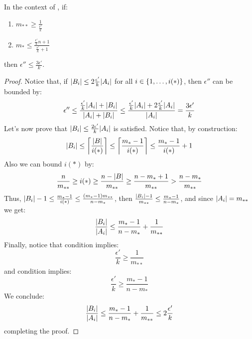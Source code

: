     \begin{remark}[Remark 5.14.3] \label{rmk:epsilons_proportion_can_be_k}
        In the context of , if:
        \begin{enumerate}[label=(\alph*), ref=\alph*]
            \item \label{itm:epsilons_proportion_can_be_k.a} $m_{**} \geq \frac{1}{\frac{\epsilon'}{k}}$
            \item \label{itm:epsilons_proportion_can_be_k.b} $m_* \leq \frac{\frac{\epsilon'}{k} n + 1}{\frac{\epsilon'}{k} + 1}$
        \end{enumerate}
        then $\epsilon'' \leq \frac{3 \epsilon'}{k}$.
        \begin{proof}
            Notice that, if $| B_i | \leq 2 \frac{\epsilon'}{k} | A_i |$ for all $i \in \{ 1, \dots, i(*) \}$,
            then $\epsilon''$ can be bounded by:
            \[
                \epsilon'' \leq \frac{\frac{\epsilon'}{k} | A_i | + | B_i |}{| A_i | + | B_i |}
                \leq \frac{\frac{\epsilon'}{k} | A_i | + 2 \frac{\epsilon'}{k} | A_i |}{| A_i |}
                = \frac{3 \epsilon'}{k}
            \]
            Let's now prove that $| B_i | \leq \frac{2 \epsilon'}{k} | A_i |$ is satisfied.
            Notice that, by construction:
            \[
                | B_i | \leq \left\lceil \frac{| B |}{i(*)} \right\rceil \leq \left\lceil \frac{m_* - 1}{i(*)} \right\rceil \leq
                \frac{m_* - 1}{i(*)} + 1
            \]
            Also we can bound $i(*)$ by:
            \[
                \frac{n}{m_{**}} \geq i(*) \geq \frac{n - | B |}{m_{**}} \geq \frac{n - m_* + 1}{m_{**}} >
                \frac{n - m_*}{m_{**}}
            \]
            Thus, $| B_i | - 1 \leq \frac{m_* - 1}{i(*)} \leq \frac{( m_* - 1 ) m_{**}}{n - m_*}$,
            then $\frac{| B_i | - 1}{m_{**}} \leq \frac{m_* - 1}{n - m_*}$, and since $| A_i | = m_{**}$
            we get:
            \[
                \frac{| B_i |}{| A_i |} \leq \frac{m_* - 1}{n - m_*} + \frac{1}{m_{**}}
            \]
            Finally, notice that condition  implies:
            \[
                \frac{\epsilon'}{k} \geq \frac{1}{m_{**}}
            \]
            and condition  implies:
            \[
                \frac{\epsilon'}{k} \geq \frac{m_* - 1}{n - m_*}
            \]
            We conclude:
            \[
                \frac{| B_i |}{| A_i |} \leq \frac{m_* - 1}{n - m_*} + \frac{1}{m_{**}} \leq 2 \frac{\epsilon'}{k}
            \]
            completing the proof.
        \end{proof}
    \end{remark}


